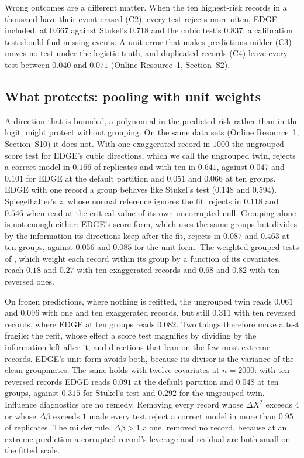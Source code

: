 Wrong outcomes are a different matter. When the ten highest-risk records in a thousand have their
event erased (C2), every test rejects more often, EDGE included, at $0.667$ against Stukel's $0.718$ and
the cubic test's $0.837$; a calibration test should find missing events. A unit error that makes
predictions milder (C3) moves no test under the logistic truth, and duplicated records (C4) leave every
test between $0.040$ and $0.071$ (Online Resource~1, Section~S2).

\subsection{What protects: pooling with unit weights}\label{sec:whatprotects}

A direction that is bounded, a polynomial in the predicted risk rather than in the logit, might
protect without grouping. On the same data sets (Online Resource~1, Section~S10) it does not. With one
exaggerated record in $1000$ the ungrouped score test for EDGE's cubic directions, which we call the
ungrouped twin, rejects a correct model in $0.166$ of replicates and with ten in $0.641$, against
$0.047$ and $0.101$ for EDGE at the default partition and $0.051$ and $0.066$ at ten groups. EDGE with
one record a group behaves like Stukel's test ($0.148$ and $0.594$). Spiegelhalter's $z$, whose normal
reference ignores the fit, rejects in $0.118$ and $0.546$ when read at the critical value of its own
uncorrupted null. Grouping alone is not enough either: EDGE's score form, which uses the same groups
but divides by the information its directions keep after the fit, rejects in $0.087$ and $0.463$ at ten
groups, against $0.056$ and $0.085$ for the unit form. The weighted grouped tests of
\citet{hosmer2002goodness}, which weight each record within its group by a function of its covariates,
reach $0.18$ and $0.27$ with ten exaggerated records and $0.68$ and $0.82$ with ten reversed ones.

On frozen predictions, where nothing is refitted, the ungrouped twin reads $0.061$ and $0.096$ with one
and ten exaggerated records, but still $0.311$ with ten reversed records, where EDGE at ten groups reads
$0.082$. Two things therefore make a test fragile: the refit, whose effect a score test magnifies by
dividing by the information left after it, and directions that lean on the few most extreme records.
EDGE's unit form avoids both, because its divisor is the variance of the clean groupmates. The same
holds with twelve covariates at $n=2000$: with ten reversed records EDGE reads $0.091$ at the default
partition and $0.048$ at ten groups, against $0.315$ for Stukel's test and $0.292$ for the ungrouped
twin. Influence diagnostics are no remedy. Removing every record whose $\Delta X^2$ exceeds $4$ or
whose $\Delta\beta$ exceeds $1$ \citep{pregibon1981logistic,hosmer2013applied} made every test reject a
correct model in more than $0.95$ of replicates. The milder rule, $\Delta\beta>1$ alone, removed no
record, because at an extreme prediction a corrupted record's leverage and residual are both small on
the fitted scale.

